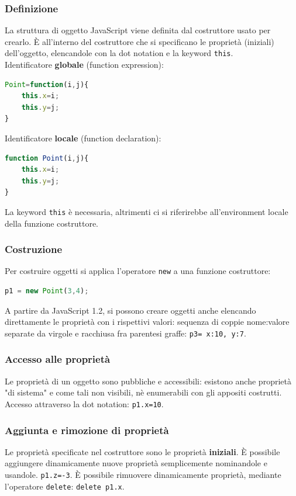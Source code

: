 \documentclass{article}
\begin{document}
\subsubsection{Definizione}
La struttura di oggetto JavaScript viene definita dal costruttore usato per crearlo. È all'interno del costruttore che si specificano le proprietà (iniziali) dell'oggetto, elencandole con la dot notation e la keyword \texttt{this}.
\\ Identificatore \textbf{globale} (function expression):
\begin{lstlisting}[language=JavaScript]
Point=function(i,j){
    this.x=i;
    this.y=j;
}
\end{lstlisting}
Identificatore \textbf{locale} (function declaration):
\begin{lstlisting}[language=JavaScript]
function Point(i,j){
    this.x=i;
    this.y=j;
}
\end{lstlisting}
La keyword \texttt{this} è necessaria, altrimenti ci si riferirebbe all'environment locale della funzione costruttore.
\subsubsection{Costruzione}
Per costruire oggetti si applica l'operatore \texttt{new} a una funzione costruttore:
\begin{lstlisting}[language=JavaScript]
p1 = new Point(3,4);
\end{lstlisting}
A partire da JavaScript 1.2, si possono creare oggetti anche elencando direttamente le proprietà con i rispettivi valori: sequenza di coppie nome:valore separate da virgole e racchiusa fra parentesi graffe: \texttt{p3= {x:10, y:7}}.
\subsubsection{Accesso alle proprietà}
Le proprietà di un oggetto sono pubbliche e accessibili: esistono anche proprietà "di sistema" e come tali non visibili, nè enumerabili con gli appositi costrutti. Accesso attraverso la dot notation: \texttt{p1.x=10}.
\subsubsection{Aggiunta e rimozione di proprietà}
Le proprietà specificate nel costruttore sono le proprietà \textbf{iniziali}. È possibile aggiungere dinamicamente nuove proprietà semplicemente nominandole e usandole. \texttt{p1.z=-3}. È possibile rimuovere dinamicamente proprietà, mediante l'operatore
\texttt{delete}: \texttt{delete p1.x}.
\end{document}
